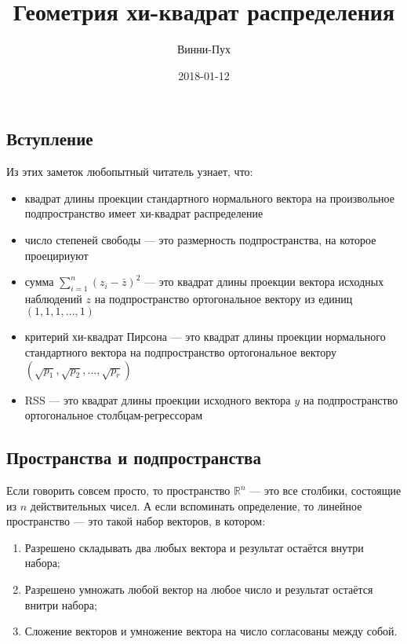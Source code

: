 \documentclass[11pt,russian,]{article}
\title{Геометрия хи-квадрат распределения}
\author{Винни-Пух}
\date{2018-01-12}
\providecommand{\tightlist}{%
  \setlength{\itemsep}{0pt}\setlength{\parskip}{0pt}}
\newcommand{\RR}{\mathbb{R}}
\renewcommand{\Rn}{\RR^n}
\newcommand{\1}{\mathbbm{1}}
\begin{document}
\maketitle

{
\setcounter{tocdepth}{2}
\tableofcontents
}
\subsection{Вступление}

Из этих заметок любопытный читатель узнает, что:

\begin{itemize}
\item
  квадрат длины проекции стандартного нормального вектора на
  произвольное подпространство имеет хи-квадрат распределение
\item
  число степеней свободы --- это размерность подпространства, на которое
  проецириуют
\item
  сумма \(\sum_{i=1}^n (z_i - \bar z)^2\) --- это квадрат длины проекции
  вектора исходных наблюдений \(z\) на подпространство ортогональное
  вектору из единиц \((1, 1, 1, \ldots, 1)\)
\item
  критерий хи-квадрат Пирсона --- это квадрат длины проекции нормального
  стандартного вектора на подпространство ортогональное вектору
  \((\sqrt{p_1}, \sqrt{p_2}, \ldots, \sqrt{p_r})\)
\item
  RSS --- это квадрат длины проекции исходного вектора \(y\) на
  подпространство ортогональное столбцам-регрессорам
\end{itemize}

\subsection{Пространства и подпространства}\label{--}

Если говорить совсем просто, то пространство \(\Rn\) --- это все
столбики, состоящие из \(n\) действительных чисел. А если вспоминать
определение, то линейное пространство --- это такой набор векторов, в
котором:

\begin{enumerate}
\def\labelenumi{\arabic{enumi}.}
\tightlist
\item
  Разрешено складывать два любых вектора и результат остаётся внутри
  набора;
\item
  Разрешено умножать любой вектор на любое число и результат остаётся
  внитри набора;
\item
  Сложение векторов и умножение вектора на число согласованы между
  собой.
\end{enumerate}
\end{document}
